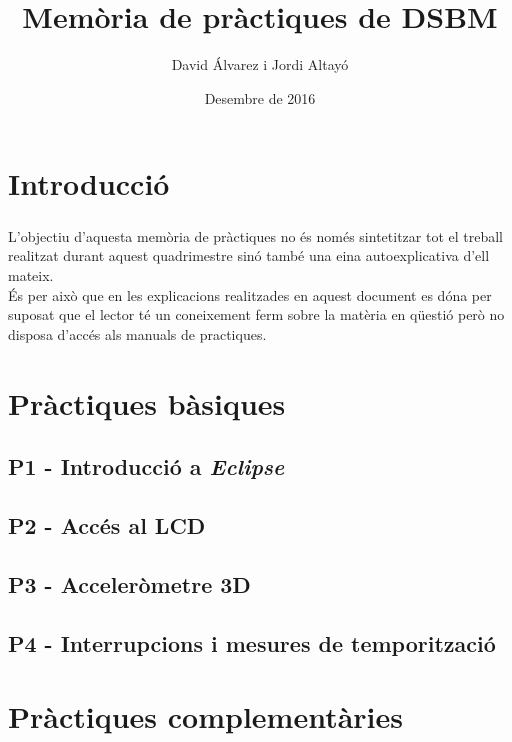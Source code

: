 \documentclass{report}
\begin{document}
	\title{Memòria de pràctiques de DSBM}
	\author{David Álvarez i Jordi Altayó}
    \date{Desembre de 2016}
    \maketitle
    
    \tableofcontents
    
    \chapter{Introducció}
    \paragraph{}
    L'objectiu d'aquesta memòria de pràctiques no és només sintetitzar tot el treball realitzat durant aquest quadrimestre sinó també una eina autoexplicativa d'ell mateix. \\
    És per això que en les explicacions realitzades en aquest document es dóna per suposat que el lector té un coneixement ferm sobre la matèria en qüestió però no disposa d'accés als manuals de practiques.
    
    \chapter{Pràctiques bàsiques}
    \section{P1 - Introducció a \textit{Eclipse}}
    \section{P2 - Accés al LCD}
    \section{P3 - Acceleròmetre 3D}
    \section{P4 - Interrupcions i mesures de temporització}
    \chapter{Pràctiques complementàries}
\end{document}
